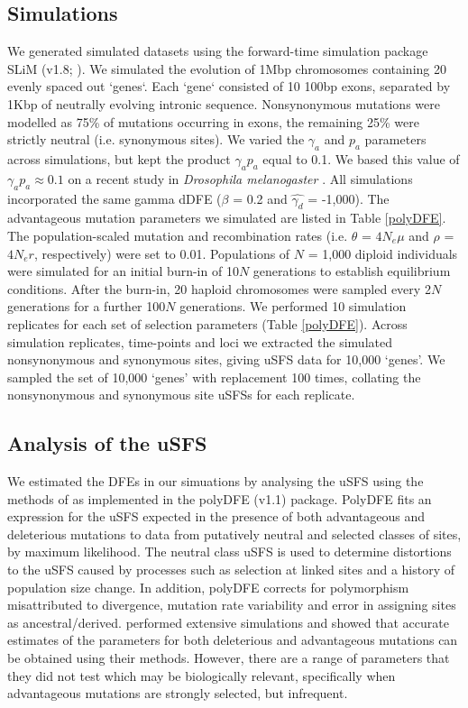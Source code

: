 	\subsection{Simulations}
	
	We generated simulated datasets using the forward-time simulation package SLiM (v1.8; \citealt{RN148}). We simulated the evolution of 1Mbp chromosomes containing 20 evenly spaced out `genes`. Each `gene` consisted of 10 100bp exons, separated by 1Kbp of neutrally evolving intronic sequence. Nonsynonymous mutations were modelled as 75\% of mutations occurring in exons, the remaining 25\% were strictly neutral (i.e. synonymous sites). We varied the $\gamma_a$ and $p_a$ parameters across simulations, but kept the product $\gamma_a p_a$ equal to 0.1. We based this value of $\gamma_a p_a \approx 0.1$ on a recent study in \textit{Drosophila melanogaster} \citep{RN321}. All simulations incorporated the same gamma dDFE ($\beta$ = 0.2 and $\hat{\gamma_d}$ = -1,000). The advantageous mutation parameters we simulated are listed in Table \ref{polyDFE}. 	The population-scaled mutation and recombination rates (i.e. $\theta$ = \emph{$4N_{e}\mu$} and $\rho$ = \emph{$4N_{e}r$}, respectively) were set to 0.01. Populations of $N$ = 1,000 diploid individuals were simulated for an initial burn-in of 10$N$ generations to establish equilibrium conditions. After the burn-in, 20 haploid chromosomes were sampled every 2$N$ generations for a further 100$N$ generations. We performed 10 simulation replicates for each set of selection parameters (Table \ref{polyDFE}). Across simulation replicates, time-points and loci we extracted the simulated nonsynonymous and synonymous sites, giving uSFS data for 10,000 `genes'. We sampled the set of 10,000 `genes' with replacement 100 times, collating the nonsynonymous and synonymous site uSFSs for each replicate.


	\subsection{Analysis of the uSFS}

	
	We estimated the DFEs in our simuations by analysing the uSFS using the methods of \cite{RN354} as implemented in the polyDFE (v1.1) package. PolyDFE fits an expression for the uSFS expected in the presence of both advantageous and deleterious mutations to data from putatively neutral and selected classes of sites, by maximum likelihood. The neutral class uSFS is used to determine distortions to the uSFS caused by processes such as selection at linked sites and a history of population size change. In addition, polyDFE corrects for polymorphism misattributed to divergence, mutation rate variability and error in assigning sites as ancestral/derived. \cite{RN354} performed extensive simulations and showed that accurate estimates of the parameters for both deleterious and advantageous mutations can be obtained using their methods. However, there are a range of parameters that they did not test which may be biologically relevant, specifically when advantageous mutations are strongly selected, but infrequent.


